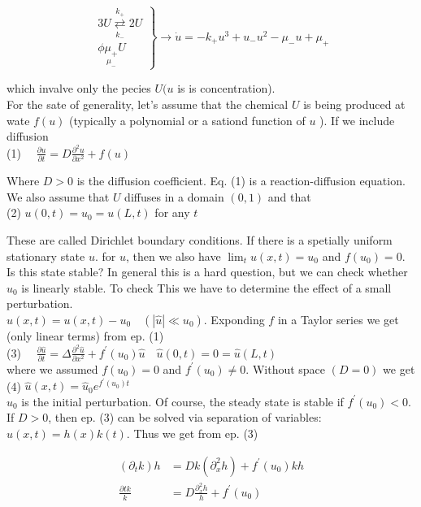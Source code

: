 \documentclass[10pt]{article}
\begin{document}
$$
\left.\begin{array}{l}
3 U \underset{k_{-}}{\stackrel{k_{+}}{\rightleftarrows}} 2 U \\
\phi \underset{\mu_{-}}{\mu_{+}} U
\end{array}\right\} \rightarrow \dot{u}=-k_{+} u^{3}+u_{-} u^{2}-\mu_{-} u+\mu_{+}
$$

which invalve only the pecies $U(u$ is is concentration).\\
For the sate of generality, let's assume that the chemical $U$ is being produced at wate $f(u)$ (typically a polynomial or a sationd function of $u$ ). If we include diffusion\\
(1) $\quad \frac{\partial u}{\partial t}=D \frac{\partial^{2} u}{\partial x^{2}}+f(u)$

Where $D>0$ is the diffusion coefficient. Eq. (1) is a reaction-diffusion equation.\\
We also assume that $U$ diffuses in a domain $(0,1)$ and that\\
(2) $u(0, t)=u_{0}=u(L, t)$ for any $t$

These are called Dirichlet boundary conditions. If there is a spetially uniform stationary state $u$. for $u$, then we also have $\lim _{t} u(x, t)=u_{0}$ and $f\left(u_{0}\right)=0$.\\
Is this state stable? In general this is a hard question, but we can check whether $u_{0}$ is linearly stable. To check This we have to determine the effect of a small perturbation.\\
$\hat{u}(x, t)=u(x, t)-u_{0} \quad\left(|\hat{u}| \ll u_{0}\right)$. Exponding $f$ in a Taylor series we get (only linear terms) from ep. (1)\\
(3) $\quad \frac{\partial \hat{u}}{\partial t}=\Delta \frac{\partial^{2} \hat{u}}{\partial x^{2}}+f^{\prime}\left(u_{0}\right) \hat{u} \quad \hat{u}(0, t)=0=\hat{u}(L, t)$\\
where we assumed $f\left(u_{0}\right)=0$ and $f^{\prime}\left(u_{0}\right) \neq 0$. Without space $(D=0)$ we get\\
(4) $\hat{u}(x, t)=\hat{u}_{0} e^{f^{\prime}\left(u_{0}\right) t}$\\
$\hat{u}_{0}$ is the initial perturbation. Of course, the steady state is stable if $f^{\prime}\left(u_{0}\right)<0$. If $D>0$, then ep. (3) can be solved via separation of variables: $\hat{u}(x, t)=h(x) k(t)$. Thus we get from ep. (3)

$$
\begin{aligned}
\left(\partial_{t} k\right) h & =D k\left(\partial_{x}^{2} h\right)+f^{\prime}\left(u_{0}\right) k h \\
\frac{\partial t k}{k} & =D \frac{\partial_{x}^{2} h}{h}+f^{\prime}\left(u_{0}\right)
\end{aligned}
$$
\end{document}
